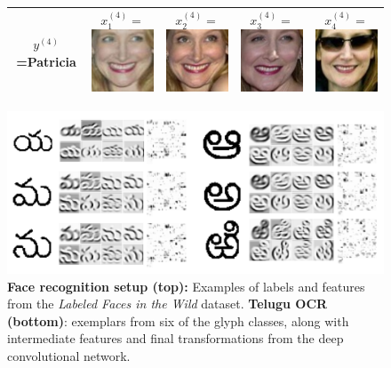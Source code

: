 \documentclass[twoside,11pt]{article}
\begin{document}
\begin{figure}
\begin{tabular}{|c|ccc|c|}
$y^{(4)}$=Patricia & 
  $x_1^{(4)} = $\includegraphics[scale = 0.2]{face_photos/Patricia_Clarkson_0001.png} &  
  $x_2^{(4)} = $\includegraphics[scale = 0.2]{face_photos/Patricia_Clarkson_0002.png} &  
  $x_3^{(4)} = $\includegraphics[scale = 0.2]{face_photos/Patricia_Clarkson_0003.png} &  
  $x_4^{(4)} = $\includegraphics[scale = 0.2]{face_photos/Patricia_Clarkson_0004.png} \\ \hline
\end{tabular}
\includegraphics[scale=0.3]{telugu_glyphs.png}
\caption{\textbf{Face recognition setup (top):} Examples of labels and features from the \emph{Labeled Faces in the Wild} dataset. \textbf{Telugu OCR (bottom)}: exemplars from six of the glyph classes, along with intermediate features and final transformations from the deep convolutional network.}
\label{fig:face_rec}
\end{figure}
\end{document}
